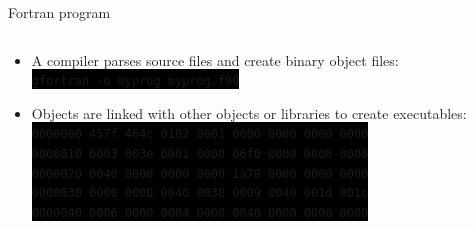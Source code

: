 \documentclass[unknownkeysallowed, 10pt, a4 paper, handout]{beamer}
\newcommand{\code}[1]{\colorbox{black}{\color{green}\texttt{#1}}}
\begin{document}
\begin{frame}[label=Fortran]{Fortran program}
\begin{columns}[T]
\begin{column}{.76\textwidth}
\begin{itemize}
{          }
        \item \normalsize{A compiler parses source files and create
           binary object files:} \\
          \footnotesize{
          \code{gfortran -o myprog myprog.f90}
          }
        \item \normalsize{Objects are linked with other objects or
           libraries to create executables:} \\
          \footnotesize{
          \code{0000000 457f 464c 0102 0001 0000 0000 0000 0000} \\
          \code{0000010 0003 003e 0001 0000 06f0 0000 0000 0000} \\
          \code{0000020 0040 0000 0000 0000 1a78 0000 0000 0000} \\
          \code{0000030 0000 0000 0040 0038 0009 0040 001d 001c} \\
          \code{0000040 0006 0000 0004 0000 0040 0000 0000 0000}
          }
      \end{itemize}
    \end{column}
  \end{columns}
\end{frame}
\end{document}
